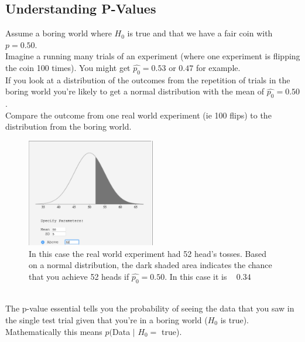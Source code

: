 \subsection{Understanding P-Values}

\noindent Assume a boring world where $H_0$ is true and that we have a fair coin with $p=0.50$. \\

\noindent Imagine a running many trials of an experiment (where one experiment is flipping the coin 100 times). You might get $\hat{p_0} = 0.53$ or $0.47$ for example.\\

\noindent If you look at a distribution of the outcomes from the repetition of trials in the boring world you're likely to get a normal distribution with the mean of $\hat{p_0} = 0.50$. \\

\noindent 
Compare the outcome from one real world experiment (ie 100 flips) to the distribution from the boring world. \\

\begin{figure}[ht]
  \begin{center}
    \includegraphics[width=0.5\textwidth]{figures/52.png}
    \caption{In this case the real world experiment had 52 head's tosses. Based on a normal distribution, the dark shaded area indicates the chance that you achieve 52 heads if $\hat{p_0} = 0.50$. In this case it is ~ $0.34$ }
    \label{fig:example_figure}
  \end{center}
\end{figure}

\\ 
\noindent The p-value essential tells you the probability of seeing the data that you saw in the single test trial given that you're in a boring world ($H_0$ is true). Mathematically this means $p($Data $\mid$ $H_0 =$ true).\\

